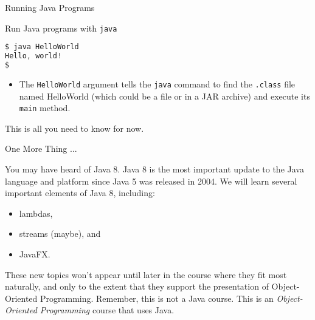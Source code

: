 \documentclass{beamer}
\begin{document}
\begin{frame}[fragile]{Running Java Programs}


Run Java programs with {\tt java}
\begin{lstlisting}[language=Scala]
$ java HelloWorld
Hello, world!
$
\end{lstlisting}
\begin{itemize}
\item The {\tt HelloWorld} argument tells the {\tt java} command to find the {\tt .class} file named HelloWorld (which could be a file or in a JAR archive) and execute its {\tt main} method.
\end{itemize}
This is all you need to know for now.
\end{frame}

\begin{frame}[fragile]{One More Thing ...}

You may have heard of Java 8.  Java 8 is the most important update to the Java language and platform since Java 5 was released in 2004.  We will learn several important elements of Java 8, including:

\begin{itemize}
\item lambdas,
\item streams (maybe), and
\item JavaFX.
\end{itemize}

These new topics won't appear until later in the course where they fit most naturally, and only to the extent that they support the presentation of Object-Oriented Programming.  Remember, this is not a Java course.  This is an {\it Object-Oriented Programming} course that uses Java.

\end{frame}






\end{document}
